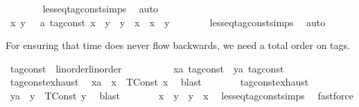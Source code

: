 \begin{isabellebody}
\ \ \ \ \ \ \isamarkupfalse%
\ less{\isacharunderscore}eq{\isacharunderscore}tag{\isacharunderscore}const{\isachardot}simps\ \isamarkupfalse%
\ auto\isanewline
\ \ \isamarkupfalse%
\isanewline
\ \ \ \ \isamarkupfalse%
\ {\isacartoucheopen}{\isasymAnd}x\ y\ \ {\isacharcolon}{\isacharcolon}\ {\isacharprime}a\ tag{\isacharunderscore}const{\isachardot}\ x\ {\isasymle}\ y\ {\isasymLongrightarrow}\ y\ {\isasymle}\ x\ {\isasymLongrightarrow}\ x\ {\isacharequal}\ y{\isacartoucheclose}\isanewline
\ \ \ \ \ \ \isamarkupfalse%
\ less{\isacharunderscore}eq{\isacharunderscore}tag{\isacharunderscore}const{\isachardot}simps\ \isamarkupfalse%
\ auto\isanewline
\ \ \isamarkupfalse%
%
\endisatagproof
{\isafoldproof}%
%
\isadelimproof
%
\endisadelimproof
\isanewline
\isanewline
{}\isamarkupfalse%
%
\begin{isamarkuptext}%
For ensuring that time does never flow backwards, we need a total order on tags.%
\end{isamarkuptext}\isamarkuptrue%
\isamarkupfalse%
\ tag{\isacharunderscore}const\ {\isacharcolon}{\isacharcolon}\ {\isacharparenleft}linorder{\isacharparenright}linorder\isanewline
{}\isanewline
\ \ \isamarkupfalse%
%
\isadelimproof
\ %
\endisadelimproof
%
\isatagproof
{}\isamarkupfalse%
\isanewline
\ \ \ \ \isamarkupfalse%
\ x{\isacharcolon}{\isacharcolon}{\isacartoucheopen}{\isacharprime}a\ tag{\isacharunderscore}const{\isacartoucheclose}\ \ y{\isacharcolon}{\isacharcolon}{\isacartoucheopen}{\isacharprime}a\ tag{\isacharunderscore}const{\isacartoucheclose}\isanewline
\ \ \ \ \isamarkupfalse%
\ tag{\isacharunderscore}const{\isachardot}exhaust\ \isamarkupfalse%
\ xa\ \ {\isacartoucheopen}x\ {\isacharequal}\ TConst\ x\ \isamarkupfalse%
\ blast\isanewline
\ \ \ \ \isamarkupfalse%
\ \isamarkupfalse%
\ tag{\isacharunderscore}const{\isachardot}exhaust\ \isamarkupfalse%
\ ya\ \ {\isacartoucheopen}y\ {\isacharequal}\ TConst\ y\ \isamarkupfalse%
\ blast\isanewline
\ \ \ \ \isamarkupfalse%
\ \isamarkupfalse%
\ {\isacartoucheopen}x\ {\isasymle}\ y\ {\isasymor}\ y\ {\isasymle}\ x{\isacartoucheclose}\ \isamarkupfalse%
\ less{\isacharunderscore}eq{\isacharunderscore}tag{\isacharunderscore}const{\isachardot}simps\ \isamarkupfalse%
\ fastforce\isanewline
\ \ \isamarkupfalse%
%
\endisatagproof
{\isafoldproof}%
%
\isadelimproof
%
\endisadelimproof
\isanewline
\isanewline
{}\isamarkupfalse%
\isanewline
%
\isadelimtheory
\isanewline
%
\endisadelimtheory
%
\isatagtheory
{}\isamarkupfalse%
%
\endisatagtheory
{\isafoldtheory}%
%
\isadelimtheory
%
\endisadelimtheory
%
\end{isabellebody}%
